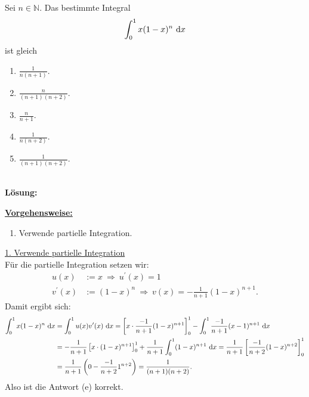 \subsection*{}
Sei $ n \in \mathbb{N} $.
Das bestimmte Integral
\begin{align*}
	\int_0^1
	x(1-x)^n
	\ \text{\rmfamily d} x
\end{align*}
ist gleich
\renewcommand{\labelenumi}{(\alph{enumi})}
\begin{enumerate}
	\item 
	$\frac{1}{n(n+1)}$.
	\item
	$\frac{n}{(n+1)(n+2)}$.
	\item
	$\frac{n}{n+1}$.
	\item
	$\frac{1}{n(n+2)}$.
	\item
	$\frac{1}{(n+1)(n+2)}$.	
\end{enumerate}
\ \\
\textbf{Lösung:}
\begin{mdframed}
\underline{\textbf{Vorgehensweise:}}
\renewcommand{\labelenumi}{\theenumi.}
\begin{enumerate}
\item Verwende partielle Integration.
\end{enumerate}
\end{mdframed}
\underline{1. Verwende partielle Integration}\\
Für die partielle Integration setzen wir:
\begin{align*}
	u(x) &:= x \ \Rightarrow \ u^\prime(x) = 1\\
	v^\prime(x) &:=(1-x)^n  \ \Rightarrow \ v(x) = -\frac{1}{n+1}(1-x)^{n+1}.
\end{align*}
Damit ergibt sich:
\begin{align*}
	\int_0^1
	x(1-x)^n
	\ \text{\rmfamily d} x
	&=
	\int_0^1
	u(x) v^\prime(x)
	\ \text{\rmfamily d} x
	=
	\left[x \cdot \frac{-1}{n+1}(1-x)^{n+1}\right]_0^1 
	-\int_0^1 \frac{-1}{n+1}(x-1)^{n+1} \ \text{\rmfamily d} x  \\
	&= 
	-\frac{1}{n+1}\left[x \cdot (1-x)^{n+1}\right]_0^1+
	\frac{1}{n+1}\int_0^1 (1-x)^{n+1} \ \text{\rmfamily d} x
	=
	\frac{1}{n+1}\left[\frac{-1}{n+2} (1-x)^{n+2}\right]_0^1\\
	&=
	\frac{1}{n+1} \left( 0  - \frac{-1}{n+2} 1^{n+2}\right) 
	=
	\frac{1}{(n+1)(n+2)}.
\end{align*}
Also ist die Antwort (e) korrekt.
\newpage

